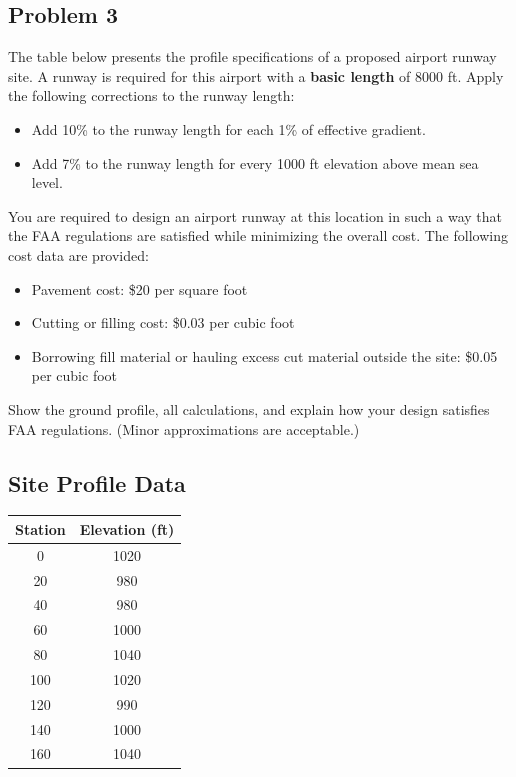 \documentclass{KPS_assignment}
\begin{document}
\begin{enumerate}
\section*{Problem 3}

The table below presents the profile specifications of a proposed airport runway site. A runway is required for this airport with a \textbf{basic length} of 8000 ft. Apply the following corrections to the runway length:

\begin{itemize}
    \item Add 10\% to the runway length for each 1\% of effective gradient.
    \item Add 7\% to the runway length for every 1000 ft elevation above mean sea level.
\end{itemize}

You are required to design an airport runway at this location in such a way that the FAA regulations are satisfied while minimizing the overall cost. The following cost data are provided:

\begin{itemize}
    \item Pavement cost: \$20 per square foot
    \item Cutting or filling cost: \$0.03 per cubic foot
    \item Borrowing fill material or hauling excess cut material outside the site: \$0.05 per cubic foot
\end{itemize}

Show the ground profile, all calculations, and explain how your design satisfies FAA regulations. (Minor approximations are acceptable.)

\subsection*{Site Profile Data}

\begin{table}[H]
\centering
\begin{tabular}{|c|c|}
\hline
\textbf{Station} & \textbf{Elevation (ft)} \\
\hline
0   & 1020 \\
20  & 980  \\
40  & 980  \\
60  & 1000 \\
80  & 1040 \\
100 & 1020 \\
120 & 990  \\
140 & 1000 \\
160 & 1040 \\
\hline
\end{tabular}
\end{table}



\end{enumerate}
\end{document}
